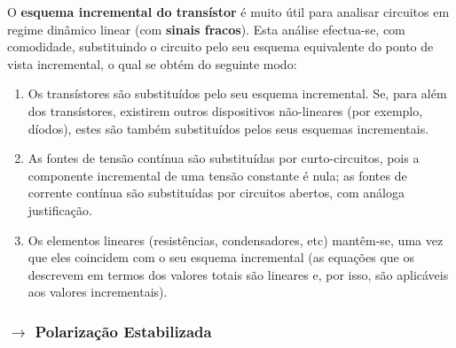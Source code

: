 \begin{mdframed} \small
    \noindent O \textbf{esquema incremental do transístor} é muito útil para analisar circuitos em regime dinâmico linear (com \textbf{sinais fracos}). Esta análise efectua-se, com comodidade, substituindo o circuito pelo seu esquema equivalente do ponto de vista incremental, o qual se obtém do seguinte modo:
    \begin{enumerate}[leftmargin=*] \small
        \item Os transístores são substituídos pelo seu esquema incremental. Se, para além dos transístores, existirem outros dispositivos não-lineares (por exemplo, díodos), estes são também substituídos pelos seus esquemas incrementais.
    
        \item As fontes de tensão contínua são substituídas por curto-circuitos, pois a componente incremental de uma tensão constante é nula; as fontes de corrente contínua são substituídas por circuitos abertos, com análoga justificação.
        
        \item Os elementos lineares (resistências, condensadores, etc) mantêm-se, uma vez que eles coincidem com o seu esquema incremental (as equações que os descrevem em termos dos valores totais são lineares e, por isso, são aplicáveis aos valores incrementais).
    \end{enumerate}
\end{mdframed}

\renewcommand*{\thefootnote}{\fnsymbol{footnote}}
\renewcommand*{\thefootnote}{\arabic{footnote}}

\subsubsection[3.1.4 Polarização Estabilizada]{$\pmb{\rightarrow}$ Polarização Estabilizada}



